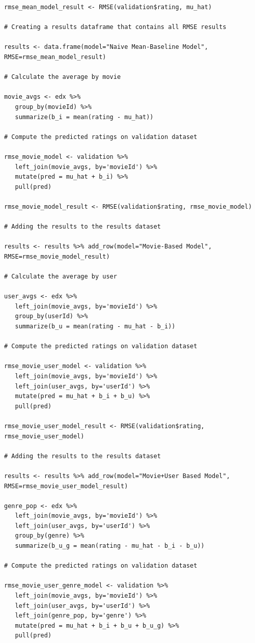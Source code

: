 \documentclass[]{article}
\begin{document}
\begin{verbatim}
rmse_mean_model_result <- RMSE(validation$rating, mu_hat)

# Creating a results dataframe that contains all RMSE results

results <- data.frame(model="Naive Mean-Baseline Model", RMSE=rmse_mean_model_result)

# Calculate the average by movie

movie_avgs <- edx %>%
   group_by(movieId) %>%
   summarize(b_i = mean(rating - mu_hat))

# Compute the predicted ratings on validation dataset

rmse_movie_model <- validation %>%
   left_join(movie_avgs, by='movieId') %>%
   mutate(pred = mu_hat + b_i) %>%
   pull(pred)

rmse_movie_model_result <- RMSE(validation$rating, rmse_movie_model)

# Adding the results to the results dataset

results <- results %>% add_row(model="Movie-Based Model", RMSE=rmse_movie_model_result)

# Calculate the average by user

user_avgs <- edx %>%
   left_join(movie_avgs, by='movieId') %>%
   group_by(userId) %>%
   summarize(b_u = mean(rating - mu_hat - b_i))

# Compute the predicted ratings on validation dataset

rmse_movie_user_model <- validation %>%
   left_join(movie_avgs, by='movieId') %>%
   left_join(user_avgs, by='userId') %>%
   mutate(pred = mu_hat + b_i + b_u) %>%
   pull(pred)

rmse_movie_user_model_result <- RMSE(validation$rating, rmse_movie_user_model)

# Adding the results to the results dataset

results <- results %>% add_row(model="Movie+User Based Model", RMSE=rmse_movie_user_model_result)

genre_pop <- edx %>%
   left_join(movie_avgs, by='movieId') %>%
   left_join(user_avgs, by='userId') %>%
   group_by(genre) %>%
   summarize(b_u_g = mean(rating - mu_hat - b_i - b_u))

# Compute the predicted ratings on validation dataset

rmse_movie_user_genre_model <- validation %>%
   left_join(movie_avgs, by='movieId') %>%
   left_join(user_avgs, by='userId') %>%
   left_join(genre_pop, by='genre') %>%
   mutate(pred = mu_hat + b_i + b_u + b_u_g) %>%
   pull(pred)


\end{verbatim}
\end{document}
